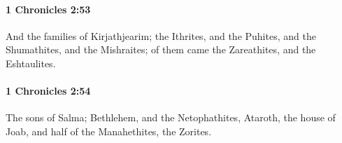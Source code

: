 		\paragraph{1 Chronicles 2:53} %
			\label{1CHRONICLES-2-53}

			And the families of Kirjathjearim; the Ithrites, and the Puhites, and the Shumathites, and the Mishraites; of them came the Zareathites, and the Eshtaulites.


		\paragraph{1 Chronicles 2:54} %
			\label{1CHRONICLES-2-54}

			The sons of Salma; Bethlehem, and the Netophathites, Ataroth, the house of Joab, and half of the Manahethites, the Zorites.


